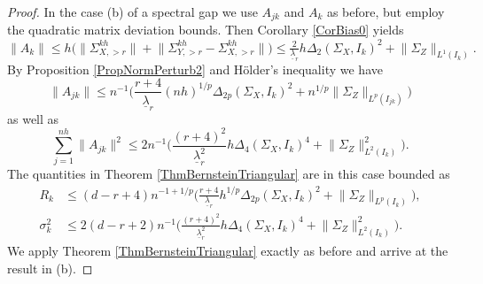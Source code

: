 \documentclass[preprint,aos]{imsart}
\numberwithin{equation}{section}
\theoremstyle{remark}
\providecommand{\norm}[1]{\lVert #1 \rVert}
\renewcommand{\le}{\leqslant}
\begin{document}
\begin{appendix}
\begin{proof}
In the case (b) of a spectral gap we use $A_{jk}$ and $A_k$ as before, but employ the quadratic matrix deviation bounds. Then Corollary \ref{CorBias0} yields
    \[\norm{A_k}\le h\big(\norm{\Sigma_{X,>r}^{kh}}+\norm{\Sigma_{Y,>r}^{kh}-\Sigma_{X,>r}^{kh}}\big)\le \tfrac{2} {\underline\lambda_r}h\Delta_2(\Sigma_{X},I_k)^2+\norm{\Sigma_{Z}}_{L^1(I_k)}.
\]
By  Proposition \ref{PropNormPerturb2} and H\"older's inequality we have
\[ \norm{A_{jk}} \le n^{-1}\Big( \frac{r+4}{\underline\lambda_r } (nh)^{1/p}\Delta_{2p}(\Sigma_X,I_k)^{2} + n^{1/p}\norm{\Sigma_Z}_{L^{p}(I_{jk})} \Big)
\]
as well as
\[ \sum_{j=1}^{nh}\norm{A_{jk}}^2 \le 2n^{-1}\Big(\frac{(r+4)^2}{\underline\lambda_r^2 }  h\Delta_4(\Sigma_X,I_k)^{4} + \norm{\Sigma_Z}_{L^2(I_k)}^2\Big).
\]
The quantities in Theorem \ref{ThmBernsteinTriangular} are in this case bounded as
\begin{align*}
R_k &\le (d-r+4)n^{-1+1/p}\Big( \frac{r+4}{\underline\lambda_r } h^{1/p}\Delta_{2p}(\Sigma_X,I_k)^{2} + \norm{\Sigma_Z}_{L^{p}(I_{k})} \Big),\\
\sigma_k^2 &\le 2(d-r+2)n^{-1}\Big(\frac{(r+4)^2}{\underline\lambda_r^2 }  h\Delta_4(\Sigma_X,I_k)^{4} + \norm{\Sigma_Z}_{L^2(I_k)}^2\Big).
\end{align*}
We apply Theorem \ref{ThmBernsteinTriangular} exactly as before and arrive at the result in (b).
\end{proof}


\end{appendix}
\end{document}
